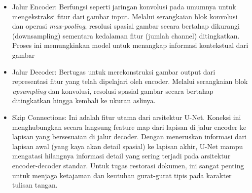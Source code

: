 \documentclass[12pt,a4paper]{article}
\begin{document}
\begin{itemize}
    \item Jalur Encoder: Berfungsi seperti jaringan konvolusi pada umumnya untuk mengekstraksi fitur dari gambar input. Melalui serangkaian blok konvolusi dan operasi \textit{max-pooling}, resolusi spasial gambar secara bertahap dikurangi (downsampling) sementara kedalaman fitur (jumlah channel) ditingkatkan. Proses ini memungkinkan model untuk menangkap informasi kontekstual dari gambar

    \item Jalur Decoder: Bertugas untuk merekonstruksi gambar output dari representasi fitur yang telah dipelajari oleh encoder. Melalui serangkaian blok \textit{upsampling} dan konvolusi, resolusi spasial gambar secara bertahap ditingkatkan hingga kembali ke ukuran aslinya.

    \item Skip Connections: Ini adalah fitur utama dari arsitektur U-Net. Koneksi ini menghubungkan secara langsung feature map dari lapisan di jalur encoder ke lapisan yang bersesuaian di jalur decoder. Dengan meneruskan informasi dari lapisan awal (yang kaya akan detail spasial) ke lapisan akhir, U-Net mampu mengatasi hilangnya informasi detail yang sering terjadi pada arsitektur encoder-decoder standar. Untuk tugas restorasi dokumen, ini sangat penting untuk menjaga ketajaman dan keutuhan gurat-gurat tipis pada karakter tulisan tangan.
\end{itemize}
\end{document}
